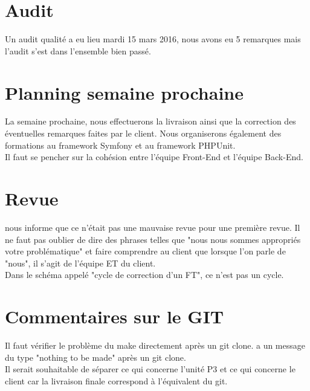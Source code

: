 \documentclass [a4paper] {article}
\begin{document}
\section{Audit}
Un audit qualité a eu lieu mardi 15 mars 2016, nous avons eu 5 remarques mais l'audit s'est dans l'ensemble bien passé.


\section{Planning semaine prochaine}
La semaine prochaine, nous effectuerons la livraison ainsi que la correction des éventuelles remarques faites par le client. Nous organiserons également des formations au framework Symfony et au framework PHPUnit. \\
Il faut se pencher sur la cohésion entre l'équipe Front-End et l'équipe Back-End.


\section{Revue}
\nomTuteurPedago{} nous informe que ce n'était pas une mauvaise revue pour une première revue. Il ne faut pas oublier de dire des phrases telles que "nous nous sommes appropriés votre problématique" et faire comprendre au client que lorsque l'on parle de "nous", il s'agit de l'équipe ET du client. \\
Dans le schéma appelé "cycle de correction d'un FT", ce n'est pas un cycle.



\section{Commentaires sur le GIT}
Il faut vérifier le problème du make directement après un git clone. \nomTuteurPedago{} a un message du type "nothing to be made" après un git clone. \\
Il serait souhaitable de séparer ce qui concerne l'unité P3 et ce qui concerne le client car la livraison finale correspond à l'équivalent du git.


\newpage
\end{document}

